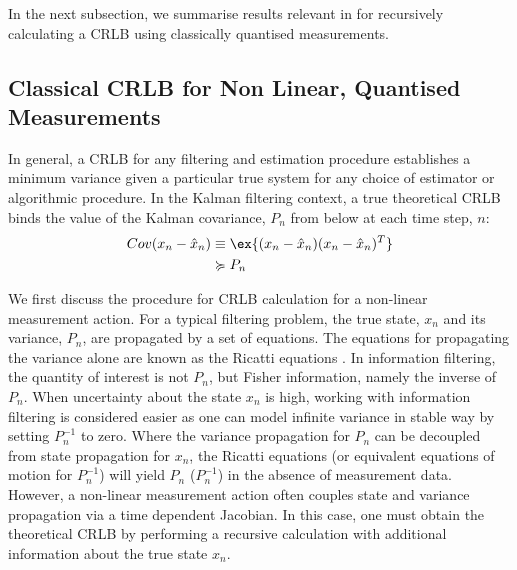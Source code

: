 In the next subsection, we summarise results relevant in  \cite{karlsson2005} for recursively calculating a CRLB using classically quantised measurements.

\subsection{Classical CRLB for Non Linear, Quantised Measurements}

In general, a CRLB for any filtering and estimation procedure establishes a minimum variance given a particular true system for any choice of estimator or algorithmic procedure. In the Kalman filtering context, a true theoretical CRLB binds the value of the Kalman covariance, $P_n$ from below at each time step, $n$:
\begin{align}
Cov(x_n- \hat{x}_n) & \equiv \ex{(x_n - \hat{x}_n)(x_n- \hat{x}_n)^T} \\
& \succcurlyeq P_n 
\end{align}
 
We first discuss the procedure for CRLB calculation for a non-linear measurement action. For a typical filtering problem,  the true state, $x_n$ and its variance, $P_n$, are propagated by a set of equations. The equations for propagating the variance alone are known as the Ricatti equations \cite{grewal2001theory}. In information filtering, the quantity of interest is not $P_n$, but Fisher information, namely the inverse of $P_n$. When uncertainty about the state $x_n$ is high, working with information filtering is considered easier as one can model infinite variance in stable way by setting $P_n^{-1}$ to zero. Where the variance propagation for $P_n$ can be decoupled from state propagation for $x_n$, the Ricatti equations (or equivalent equations of motion for $P_n^{-1}$) will yield $P_n$ ($P_n^{-1}$) in the absence of measurement data. However, a non-linear measurement action often couples state and variance propagation via a time dependent Jacobian. In this case, one must obtain the theoretical CRLB by performing a recursive calculation with additional information about the true state $x_n$. 


